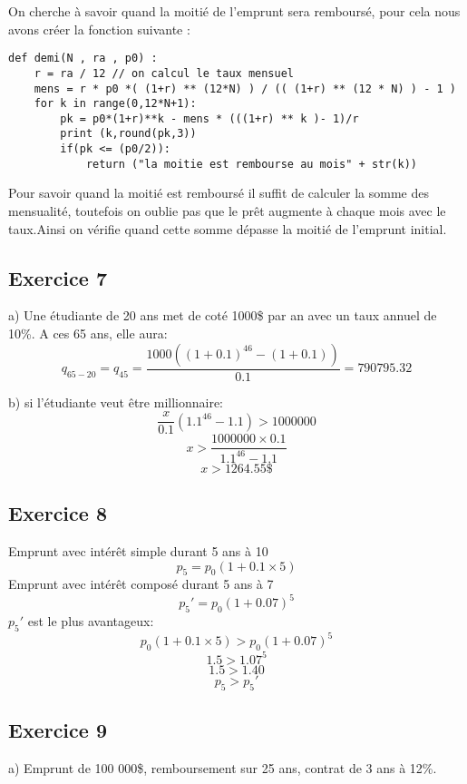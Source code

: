 \documentclass[12pt]{article}
\begin{document}
On cherche à savoir quand la moitié de l'emprunt sera remboursé, pour cela nous avons créer la fonction suivante : 
\begin{lstlisting}
def demi(N , ra , p0) : 
    r = ra / 12 // on calcul le taux mensuel 
    mens = r * p0 *( (1+r) ** (12*N) ) / (( (1+r) ** (12 * N) ) - 1 )
    for k in range(0,12*N+1):
        pk = p0*(1+r)**k - mens * (((1+r) ** k )- 1)/r
        print (k,round(pk,3))
        if(pk <= (p0/2)):
            return ("la moitie est rembourse au mois" + str(k))
\end{lstlisting}
Pour savoir quand la moitié est remboursé il suffit de calculer la somme des mensualité,
toutefois on oublie pas que le prêt augmente à chaque mois avec le taux.Ainsi on vérifie 
quand cette somme dépasse la moitié de l'emprunt initial.
\newpage
\subsection{Exercice 7}

a) Une étudiante de 20 ans met de coté 1000\$ par an avec un taux annuel de 10\%. A ces 65 ans, elle aura:\\
$$q_{65-20} = q_{45} = \frac{1000((1+0.1)^{46} - (1+0.1))}{0.1} = 790 795.32$$

b) si l'étudiante veut être millionnaire: 
$$\frac{x}{0.1}(1.1^{46}-1.1) > 1000000$$
$$x > \frac{1000000\times 0.1}{1.1^{46}-1.1}$$
$$x > 1264.55\$$$

\subsection{Exercice 8}
Emprunt avec intérêt simple durant 5 ans à 10%
$$p_5 = p_0(1+0.1\times 5)$$
Emprunt avec intérêt composé durant 5 ans à 7%
$$p_5'=p_0(1+0.07)^5$$
$p_5'$ est le plus avantageux:
$$p_0(1+0.1\times 5) > p_0(1+0.07)^5$$
$$1.5>1.07^5$$
$$1.5>1.40$$
$$p_5>p_5'$$

\subsection{Exercice 9}

a) Emprunt de 100 000\$, remboursement sur 25 ans, contrat de 3 ans à 12\%.
\end{document}
